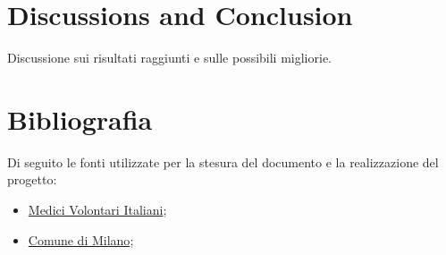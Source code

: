 \documentclass[12pt,a4paper,twoside,openright,titlepage]{book}
\begin{document}
\chapter{Discussions and Conclusion}
Discussione sui risultati raggiunti e sulle possibili migliorie.

\chapter{Bibliografia}
Di seguito le fonti utilizzate per la stesura del documento e la realizzazione del progetto:
\begin{itemize}
\item \href{https://www.medicivolontaritaliani.org/}{Medici Volontari Italiani};
\item \href{https://www.comune.milano.it/aree-tematiche/servizi-sociali/raccolta-dati-personali-per-interventi-di-emergenza}{Comune di Milano};
\end{itemize}
\end{document}
